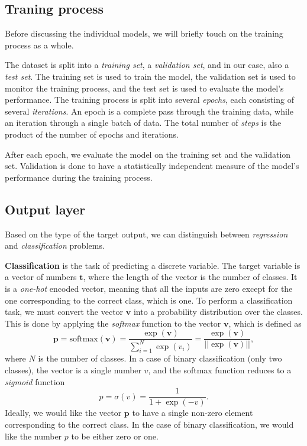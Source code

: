 \subsection{Traning process}
\label{sec:training_process}
Before discussing the individual models, we will briefly touch on the training process as a whole.

The dataset is split into a \emph{training set}, a \emph{validation set}, and in our case, also a \emph{test set}.
The training set is used to train the model, the validation set is used to monitor the training process, and the test set is used to evaluate the model's performance.
The training process is split into several \emph{epochs}, each consisting of several \emph{iterations}.
An epoch is a complete pass through the training data, while an iteration through a single batch of data.
The total number of \emph{steps} is the product of the number of epochs and iterations. 

After each epoch, we evaluate the model on the training set and the validation set.
Validation is done to have a statistically independent measure of the model's performance during the training process.


\subsection{Output layer}
\label{sec:output_layer}
Based on the type of the target output, we can distinguish between \emph{regression} and \emph{classification} problems.

\textbf{Classification} is the task of predicting a discrete variable.
The target variable is a vector of numbers $\pmb{t}$, where the length of the vector is the number of classes.
It is a \emph{one-hot} encoded vector, meaning that all the inputs are zero except for the one corresponding to the correct class, which is one.
To perform a classification task, we must convert the vector $\pmb{v}$ into a probability distribution over the classes.
This is done by applying the \emph{softmax} function to the vector $\pmb{v}$, which is defined as
\begin{equation}
    \pmb{p} = \mathrm{softmax}(\pmb{v}) = \frac{\exp(\pmb{v})}{\sum_{i=1}^N \exp(v_i)} = \frac{\exp(\pmb{v})}{||\exp(\pmb{v})||},
\end{equation}
where $N$ is the number of classes.
In a case of binary classification (only two classes), the vector is a single number $v$, and the softmax function reduces to a \emph{sigmoid} function
\begin{equation}
    p = \sigma(v) = \frac{1}{1 + \exp(-v)}.
\end{equation}
Ideally, we would like the vector $\pmb{p}$ to have a single non-zero element corresponding to the correct class. 
In the case of binary classification, we would like the number $p$ to be either zero or one.

